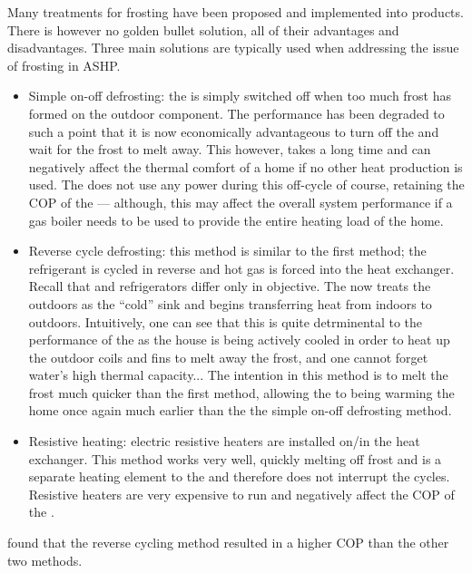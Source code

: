Many treatments for frosting have been proposed and implemented into products. There is however no golden bullet solution, all of their advantages and disadvantages. Three main solutions are typically used when addressing the issue of frosting in \acs{ASHP}. 
\begin{itemize}
    \item Simple on-off defrosting: the \HP is simply switched off when too much frost has formed on the outdoor component. The performance has been degraded to such a point that it is now economically advantageous to turn off the \HP and wait for the frost to melt away. This however, takes a long time and can negatively affect the thermal comfort of a home if no other heat production is used. The \HP does not use any power during this off-cycle of course, retaining the \ac{COP} of the \HP --- although, this may affect the overall system performance if a gas boiler needs to be used to provide the entire heating load of the home.
    \item Reverse cycle defrosting: this method is similar to the first method; the refrigerant is cycled in reverse and hot gas is forced into the heat exchanger. Recall that \HPs and refrigerators differ only in objective. The \HP now treats the outdoors as the ``cold'' sink and begins transferring heat from indoors to outdoors. Intuitively, one can see that this is quite detrminental to the performance of the \HP as the house is being actively cooled in order to heat up the outdoor coils and fins to melt away the frost, and one cannot forget water's high thermal capacity... The intention in this method is to melt the frost much quicker than the first method, allowing the \ASHP to being warming the home once again much earlier than the the simple on-off defrosting method.
    \item Resistive heating: electric resistive heaters are installed on/in the heat exchanger. This method works very well, quickly melting off frost and is a separate heating element to the \HP and therefore does not interrupt the \HPs cycles. Resistive heaters are very expensive to run and negatively affect the \ac{COP} of the \HP.
\end{itemize}

\cite{amer_review_2017} found that the reverse cycling method resulted in a higher \ac{COP} than the other two methods. 

